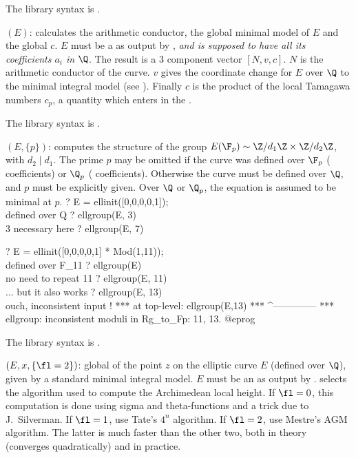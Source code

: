 The library syntax is .

$(E)$: \label{se:ellglobalred}
calculates the arithmetic conductor, the global
minimal model of $E$ and the global  $c$.
$E$ must be a  as output by , \emph{and is supposed
to have all its coefficients $a_i$ in} $\Q$. The result is a 3 component
vector $[N,v,c]$. $N$ is the arithmetic conductor of the curve. $v$ gives the
coordinate change for $E$ over $\Q$ to the minimal integral model (see
). Finally $c$ is the product of the local Tamagawa
numbers $c_p$, a quantity which enters in the .

The library syntax is .

$(E,\{p\})$: \label{se:ellgroup}computes the structure of the group $E(\F_p) \sim \Z/d_1\Z \times
\Z/d_2\Z$, with $d_2\mid d_1$. The prime $p$ may be omitted if the curve
was defined over $\F_p$ ( coefficients) or $\Q_p$ (
coefficients). Otherwise the curve must be defined over $\Q$, and $p$ must
be explicitly given. Over $\Q$ or $\Q_p$, the equation is assumed to be
minimal at $p$.
\bprog
? E = ellinit([0,0,0,0,1]);  \\ defined over Q
? ellgroup(E, 3)  \\ 3 necessary here
? ellgroup(E, 7)

? E = ellinit([0,0,0,0,1] * Mod(1,11));  \\ defined over F_11
? ellgroup(E)   \\ no need to repeat 11
? ellgroup(E, 11)   \\ ... but it also works
? ellgroup(E, 13) \\ ouch, inconsistent input !
   ***   at top-level: ellgroup(E,13)
   ***                 ^--------------
   *** ellgroup: inconsistent moduli in Rg_to_Fp: 11, 13.
@eprog

The library syntax is .

$(E,x,\{\fl=2\})$: \label{se:ellheight}global  of the point $z$ on the elliptic curve
$E$ (defined over $\Q$), given by a standard minimal integral model. $E$
must be an  as output by . \fl selects the algorithm
used to compute the Archimedean local height. If $\fl=0$, this computation
is done using sigma and theta-functions and a trick due to J.~Silverman. If
$\fl=1$, use Tate's $4^n$ algorithm. If $\fl=2$, use Mestre's AGM algorithm.
The latter is much faster than the other two, both in theory (converges
quadratically) and in practice.

